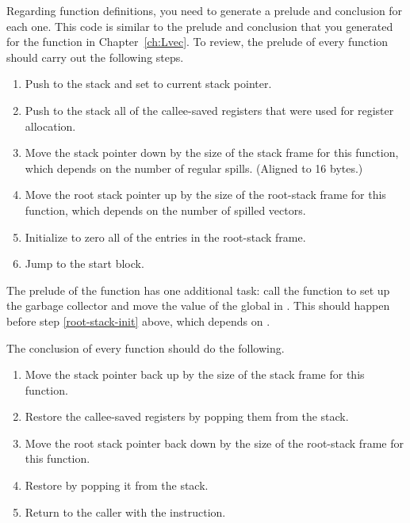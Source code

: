 \documentclass[7x10]{TimesAPriori_MIT}%
\begin{document}
Regarding function definitions, you need to generate a prelude
and conclusion for each one. This code is similar to the prelude and
conclusion that you generated for the  function in
Chapter~\ref{ch:Lvec}. To review, the prelude of every function
should carry out the following steps.
\begin{enumerate}
\item Push  to the stack and set  to current stack
  pointer.
\item Push to the stack all of the callee-saved registers that were
  used for register allocation.
\item Move the stack pointer  down by the size of the stack
  frame for this function, which depends on the number of regular
  spills. (Aligned to 16 bytes.)
\item Move the root stack pointer  up by the size of the
  root-stack frame for this function, which depends on the number of
  spilled vectors. \label{root-stack-init}
\item Initialize to zero all of the entries in the root-stack frame.
\item Jump to the start block.
\end{enumerate}
The prelude of the  function has one additional task: call
the  function to set up the garbage collector and
move the value of the global  in
. This should happen before step \ref{root-stack-init}
above, which depends on .

The conclusion of every function should do the following.
\begin{enumerate}
\item Move the stack pointer back up by the size of the stack frame
  for this function.
\item Restore the callee-saved registers by popping them from the
  stack.
\item Move the root stack pointer back down by the size of the
  root-stack frame for this function.
\item Restore  by popping it from the stack.
\item Return to the caller with the  instruction.
\end{enumerate}
\end{document}
